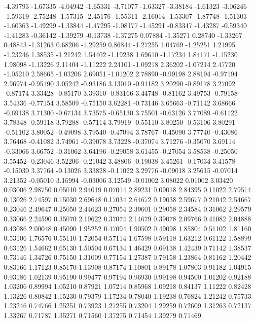  -4.39793
-1.67335 -4.04942
-1.65331 -3.71077
-1.63327 -3.38184
-1.61323 -3.06246
-1.59319 -2.75248
-1.57315 -2.45176
-1.55311 -2.16014
-1.53307 -1.87748
-1.51303 -1.60363
-1.49299 -1.33844
-1.47295 -1.08177
-1.45291 -0.83347
-1.43287 -0.59340
-1.41283 -0.36142
-1.39279 -0.13738
-1.37275 0.07884
-1.35271 0.28740
-1.33267 0.48843
-1.31263 0.68206
-1.29259 0.86844
-1.27255 1.04769
-1.25251 1.21995
-1.23246 1.38535
-1.21242 1.54402
-1.19238 1.69610
-1.17234 1.84171
-1.15230 1.98098
-1.13226 2.11404
-1.11222 2.24101
-1.09218 2.36202
-1.07214 2.47720
-1.05210 2.58665
-1.03206 2.69051
-1.01202 2.78890
-0.99198 2.88194
-0.97194 2.96974
-0.95190 3.05242
-0.93186 3.13010
-0.91182 3.20290
-0.89178 3.27092
-0.87174 3.33428
-0.85170 3.39310
-0.83166 3.44748
-0.81162 3.49753
-0.79158 3.54336
-0.77154 3.58509
-0.75150 3.62281
-0.73146 3.65663
-0.71142 3.68666
-0.69138 3.71300
-0.67134 3.73575
-0.65130 3.75501
-0.63126 3.77089
-0.61122 3.78348
-0.59118 3.79288
-0.57114 3.79919
-0.55110 3.80250
-0.53106 3.80291
-0.51102 3.80052
-0.49098 3.79540
-0.47094 3.78767
-0.45090 3.77740
-0.43086 3.76468
-0.41082 3.74961
-0.39078 3.73228
-0.37074 3.71276
-0.35070 3.69114
-0.33066 3.66752
-0.31062 3.64196
-0.29058 3.61455
-0.27054 3.58538
-0.25050 3.55452
-0.23046 3.52206
-0.21042 3.48806
-0.19038 3.45261
-0.17034 3.41578
-0.15030 3.37764
-0.13026 3.33828
-0.11022 3.29776
-0.09018 3.25615
-0.07014 3.21352
-0.05010 3.16994
-0.03006 3.12549
-0.01002 3.08022
0.01002 3.03420
0.03006 2.98750
0.05010 2.94019
0.07014 2.89231
0.09018 2.84395
0.11022 2.79514
0.13026 2.74597
0.15030 2.69648
0.17034 2.64672
0.19038 2.59677
0.21042 2.54667
0.23046 2.49647
0.25050 2.44623
0.27054 2.39601
0.29058 2.34584
0.31062 2.29579
0.33066 2.24590
0.35070 2.19622
0.37074 2.14679
0.39078 2.09766
0.41082 2.04888
0.43086 2.00048
0.45090 1.95252
0.47094 1.90502
0.49098 1.85804
0.51102 1.81160
0.53106 1.76576
0.55110 1.72054
0.57114 1.67598
0.59118 1.63212
0.61122 1.58899
0.63126 1.54662
0.65130 1.50504
0.67134 1.46429
0.69138 1.42439
0.71142 1.38537
0.73146 1.34726
0.75150 1.31009
0.77154 1.27387
0.79158 1.23864
0.81162 1.20442
0.83166 1.17123
0.85170 1.13908
0.87174 1.10801
0.89178 1.07803
0.91182 1.04915
0.93186 1.02139
0.95190 0.99477
0.97194 0.96930
0.99198 0.94500
1.01202 0.92188
1.03206 0.89994
1.05210 0.87921
1.07214 0.85968
1.09218 0.84137
1.11222 0.82428
1.13226 0.80842
1.15230 0.79379
1.17234 0.78040
1.19238 0.76824
1.21242 0.75733
1.23246 0.74766
1.25251 0.73923
1.27255 0.73204
1.29259 0.72609
1.31263 0.72137
1.33267 0.71787
1.35271 0.71560
1.37275 0.71454
1.39279 0.71469
